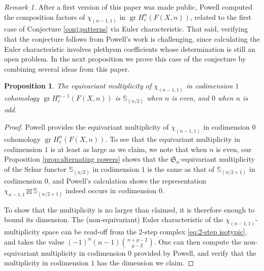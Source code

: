 \documentclass[12pt]{article}
\newcommand{\SymGroup}[1][n]{\mathfrak{S}_{#1}}
\newcommand{\Specht}[1]{\chi_{#1}}
\newcommand{\Schur}[1]{\mathbb{S}_{#1}}
\DeclareMathOperator{\gr}{gr}
\theoremstyle{plain}
\newtheorem{prop}[thm]{Proposition}
\theoremstyle{definition}
\theoremstyle{remark}
\newtheorem{rmk}[thm]{Remark}
\begin{document}

\begin{rmk}
    After a first version of this paper was made public, Powell \cite{PowBabyBead} computed the composition factors of $\Specht{(n-1,1)}$ in $\gr H_c^n(F(X,n))$, related to the first case of Conjecture \ref{conj:patterns} via Euler characteristic. That said, verifying that the conjecture follows from Powell's work is challenging, since calculating the Euler characteristic involves plethysm coefficients whose determination is still an open problem. In the next proposition we prove this case of the conjecture by combining several ideas from this paper.
\end{rmk}

\begin{prop}\label{prop:Powell-baby-bead}
    The equivariant multiplicity of $\Specht{(n-1,1)}$ in codimension $1$ cohomology $\gr H_c^{n-1}(F(X,n))$ is  $\Schur{{(n/2)}}$ when $n$ is even, and $0$ when $n$ is odd.
\end{prop}

\begin{proof}
    Powell \cite[Theorem 3]{PowBabyBead} provides the equivariant multiplicity of $\Specht{(n-1,1)}$ in codimension $0$ cohomology $\gr H_c^n(F(X,n))$. To see that the equivariant multiplicity in codimension $1$ is at least as large as we claim, we note that when $n$ is even, our Proposition \ref{prop:alternating powers} shows that the $\SymGroup$-equivariant multiplicity of the Schur functor $\Schur{(n/2)}$ in codimension $1$ is the same as that of $\Schur{(n/2+1)}$ in codimension $0$, and Powell's calculation shows the representation $\Specht{n-1,1}\boxtimes \Schur{(n/2+1)}$ indeed occurs in codimension $0$.
    
    To show that the multiplicity is no larger than claimed, it is therefore enough to bound its dimension. The (non-equivariant) Euler characteristic of the $\Specht{(n-1,1)}$-multiplicity space can be read-off from the 2-step complex \eqref{eq:2-step isotypic}, and takes the value $(-1)^n(n-1)\binom{n+g-2}{g-2}$.
    One can then compute the non-equivariant multiplicity in codimension $0$ provided by Powell, and verify that the multiplicity in codimension $1$ has the dimension we claim.%
\end{proof}
\end{document}
